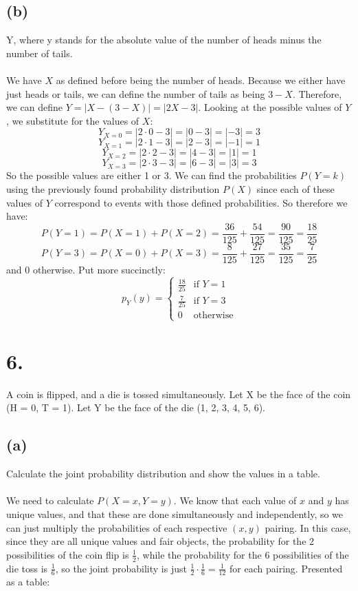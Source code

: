 \documentclass{article}
\begin{document}
{\subsection*{(b)} 
Y, where y stands for the absolute value of the number of heads minus the number of tails.
\\
\\
We have \(X\) as defined before being the number of heads. Because we either have just heads or tails, we can define the number of tails as being \(3-X\). Therefore, we can define \(Y = |X - (3 - X)| = |2X - 3|\). Looking at the possible values of \(Y\), we substitute for the values of \(X\):
\[
Y_{X=0} = |2 \cdot 0 - 3| = |0 - 3| = |-3| = 3
\]
\[
Y_{X=1} = |2 \cdot 1 - 3| = |2 - 3| = |-1| = 1
\]
\[
Y_{X=2} = |2 \cdot 2 - 3| = |4 - 3| = |1| = 1
\]
\[
Y_{X=3} = |2 \cdot 3 - 3| = |6 - 3| = |3| = 3
\]
So the possible values are either 1 or 3. We can find the probabilities \(P(Y=k)\) using the previously found probability distribution \(P(X)\) since each of these values of \(Y\) correspond to events with those defined probabilities. So therefore we have:
\[
P(Y=1) = P(X=1) + P(X=2) = \frac{36}{125} + \frac{54}{125} = \frac{90}{125} = \frac{18}{25}
\]
\[
P(Y=3) = P(X=0) + P(X=3) = \frac{8}{125} + \frac{27}{125} = \frac{35}{125} = \frac{7}{25}
\]
and 0 otherwise. Put more succinctly:
\[
p_{Y}(y) = \begin{cases}
\frac{18}{25} & \text{if } Y = 1 \\
\frac{7}{25} & \text{if } Y = 3 \\
0 & \text{otherwise}
\end{cases}
\]

\section*{6.}
A coin is flipped, and a die is tossed simultaneously. Let X be the face of the coin (H = 0, T = 1).
Let Y be the face of the die (1, 2, 3, 4, 5, 6).

\subsection*{(a)}
Calculate the joint probability distribution and show the values in a table.
\\
\\
We need to calculate \(P(X = x, Y = y)\). We know that each value of \(x\) and \(y\) has unique values, and that these are done simultaneously and independently, so we can just multiply the probabilities of each respective \((x,y)\) pairing. In this case, since they are all unique values and fair objects, the probability for the 2 possibilities of the coin flip is \(\frac{1}{2}\), while the probability for the 6 possibilities of the die toss is \(\frac{1}{6}\), so the joint probability is just \(\frac{1}{2} \cdot \frac{1}{6} = \frac{1}{12}\) for each pairing. Presented as a table:

}
\end{document}
